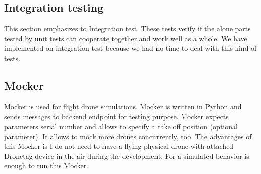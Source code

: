 \subsection{Integration testing}\label{subsec:integration-testing}
This section emphasizes to Integration test.
These tests verify if the alone parts tested by unit tests can cooperate together and work well as a whole.
We have implemented on integration test because we had no time to deal with this kind of tests.


\subsection{Mocker}\label{subsec:mocker}
Mocker is used for flight drone simulations.
Mocker is written in Python and sends messages to backend endpoint for testing purpose.
Mocker expects parameters serial number and allows to specify a take off position (optional parameter).
It allows to mock more drones concurrently, too.
The advantages of this Mocker is I do not need to have a flying physical drone with attached Dronetag device in the air during the development.
For a simulated behavior is enough to run this Mocker.
